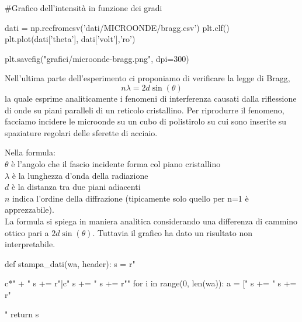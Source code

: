 \begin{sagesilent}
#Grafico dell'intensità in funzione dei gradi

dati = np.recfromcsv('dati/MICROONDE/bragg.csv')
plt.clf()
plt.plot(dati['theta'], dati['volt'],'ro')

plt.savefig("grafici/microonde-bragg.png", dpi=300)

\end{sagesilent}


Nell'ultima parte dell'esperimento ci proponiamo di verificare la legge di Bragg, 
\begin{equation}
n \lambda = 2 d \sin(\theta)
\end{equation}
la quale esprime analiticamente i fenomeni di interferenza causati dalla riflessione di onde su piani paralleli di un reticolo cristallino. Per riprodurre il fenomeno, facciamo incidere le microonde su un cubo di polistirolo su cui sono inserite su spaziature regolari delle sferette di acciaio.

Nella formula:\\
$\theta$ è l'angolo che il fascio incidente forma col piano cristallino\\
$\lambda$ è la lunghezza d'onda della radiazione\\
$d$ è la distanza tra due piani adiacenti\\
$n$ indica l'ordine della diffrazione (tipicamente solo quello per n=1 è apprezzabile).\\

La formula si spiega in maniera analitica considerando una differenza di cammino ottico pari a $2d\sin(\theta)$.
Tuttavia il grafico ha dato un risultato non interpretabile. 

\begin{sagesilent}
def stampa_dati(wa, header):
  s = r"\begin{tabular}{c*{" + "%
  s += r"}{|c}}"
  s += "%
  s += r"\midrule"
  for i in range(0, len(wa)):
    a = ["%
    s += "%
  s += r"\end{tabular}"
  return s
\end{sagesilent}

